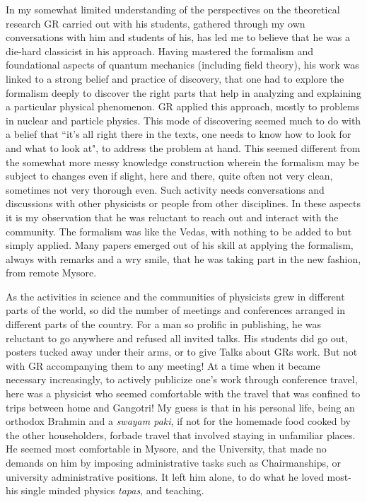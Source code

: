 In my somewhat limited understanding of the perspectives on the theoretical research GR carried out with his students, gathered through my own conversations with him and students of his, has led me to believe that he was a die-hard classicist in his approach. Having mastered the formalism and foundational aspects of quantum mechanics (including field theory), his work was linked to a strong belief and practice of discovery, that one had to explore the formalism deeply to discover the right parts that help in analyzing and explaining a particular physical phenomenon. GR applied this approach, mostly to problems in nuclear and particle physics. This mode of discovering seemed much to do with a belief that ``it's all right there in the texts, one needs to know how to look for and what to look at", to address the problem at hand. This seemed different from the somewhat more messy knowledge construction wherein the formalism may be subject to changes even if slight, here and there, quite often not very clean, sometimes not very thorough even. Such activity needs conversations and discussions with other physicists or people from other disciplines. In these aspects it is my observation that he was reluctant to reach out and interact with the community. The formalism was like the Vedas, with nothing to be added to but simply applied. Many papers emerged out of his skill at applying the formalism, always with remarks and a wry smile, that he was taking part in the new fashion, from remote Mysore.

As the activities in science and the communities of physicists grew in different parts of the world, so did the number of meetings and conferences arranged in different parts of the country. For a man so prolific in publishing, he was reluctant to go anywhere and refused all invited talks. His students did go out, posters tucked away under their arms, or to give Talks about GRs work. But not with GR accompanying them to any meeting! At a time when it became necessary increasingly, to actively publicize one's work through conference travel, here was a physicist who seemed comfortable with the travel that was confined to trips between home and Gangotri!  My guess is that in his personal life, being an orthodox Brahmin and a \textit{swayam paki}, if not for the homemade food cooked by the other householders, forbade travel that involved staying in unfamiliar places. He seemed most comfortable in Mysore, and the University, that made no demands on him by imposing administrative tasks such as Chairmanships, or university administrative positions. It left him alone, to do what he loved most-his single minded physics \textit{tapas}, and teaching.
\vspace{.5cm}

